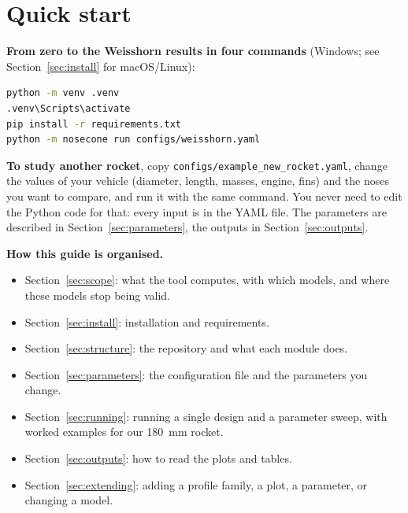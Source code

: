 \section*{Quick start}

\noindent\textbf{From zero to the Weisshorn results in four commands} (Windows; see Section~\ref{sec:install}
for macOS/Linux):
\begin{lstlisting}[language=bash]
python -m venv .venv
.venv\Scripts\activate
pip install -r requirements.txt
python -m nosecone run configs/weisshorn.yaml
\end{lstlisting}

\medskip
\noindent\textbf{To study another rocket}, copy \texttt{configs/example\_new\_rocket.yaml}, change the values of
your vehicle (diameter, length, masses, engine, fins) and the noses you want to compare, and run it with the same
command. You never need to edit the Python code for that: every input is in the YAML file. The parameters
are described in Section~\ref{sec:parameters}, the outputs in Section~\ref{sec:outputs}.

\medskip
\noindent\textbf{How this guide is organised.}
\begin{itemize}[leftmargin=*,itemsep=1pt]
\item Section~\ref{sec:scope}: what the tool computes, with which models, and where these models stop being valid.
\item Section~\ref{sec:install}: installation and requirements.
\item Section~\ref{sec:structure}: the repository and what each module does.
\item Section~\ref{sec:parameters}: the configuration file and the parameters you change.
\item Section~\ref{sec:running}: running a single design and a parameter sweep, with worked examples for our 180~mm rocket.
\item Section~\ref{sec:outputs}: how to read the plots and tables.
\item Section~\ref{sec:extending}: adding a profile family, a plot, a parameter, or changing a model.
\end{itemize}
